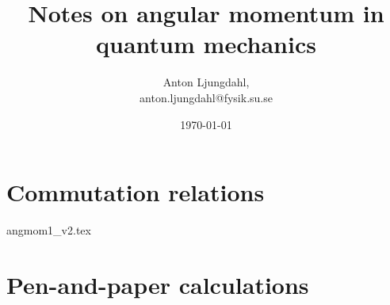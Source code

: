 \documentclass[12pt,a4paper]{article}
\numberwithin{equation}{section}
\begin{document}
\author{Anton Ljungdahl, \\
\small{anton.ljungdahl@fysik.su.se}}
\title{Notes on angular momentum in quantum mechanics}
\date{\today}
\maketitle
\tableofcontents
\section{Commutation relations}
{angmom1_v2.tex}

\appendix
\section{Pen-and-paper calculations}

\end{document}
